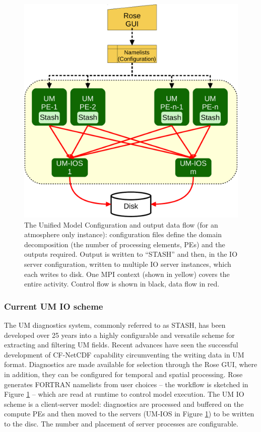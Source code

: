 \documentclass[twocolumn, 5p, times]{elsarticle}
\begin{document}
\begin{figure}
        \includegraphics[width=\columnwidth]{figures/xios_figures_c.pdf}
        \caption{The Unified Model Configuration and output data flow (for an atmosphere only instance): configuration files define the domain decomposition (the number of processing elements, PEs) and the outputs required. Output is written to ``STASH'' and then, in the IO server configuration, written to multiple IO server instances, which each writes to disk. One MPI context (shown in yellow) covers the entire activity.
                Control flow is shown in black, data flow in red.
}
\label{uma-fig}
\end{figure}

\subsubsection{Current UM IO scheme}
The UM diagnostics system, commonly referred to as STASH, has been developed over 25 years into a highly configurable and versatile scheme for extracting and filtering UM fields. Recent advances have seen the successful development of CF-NetCDF capability circumventing the writing data in UM format. Diagnostics are made available for selection through the Rose GUI, where in addition, they can be configured for temporal and spatial processing. Rose generates FORTRAN namelists from user choices -- the workflow is sketched in Figure \ref{uma-fig} -- which are read at runtime to control model execution.
The UM IO scheme is a client-server model: diagnostics are processed and buffered on the compute PEs and then moved to the servers (UM-IOS in Figure \ref{uma-fig}) to be written to the disc. The number and placement of server processes are configurable.
\end{document}
